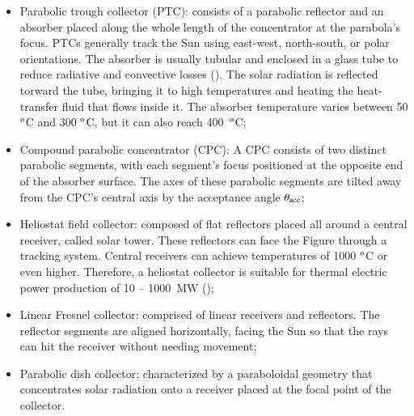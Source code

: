 \begin{itemize}
	\item Parabolic trough collector (PTC): consists of a parabolic reflector and an absorber placed along the whole length of the concentrator at the parabola's focus. PTCs generally track the Sun using east-west, north-south, or polar orientations. The absorber is usually tubular and enclosed in a glass tube to reduce radiative and convective losses (\cite{Goswami2015}). The solar radiation is reflected torward the tube, bringing it to high temperatures and heating the heat-transfer fluid that flows inside it. The absorber temperature varies between 50 $^{\rm{o}}$C and 300 $^{\rm{o}}$C, but it can also reach \mbox{400 $^{\rm{o}}$C};
	
	\item Compound parabolic concentrator (CPC): A CPC consists of two distinct parabolic segments, with each segment's focus positioned at the opposite end of the absorber surface. The axes of these parabolic segments are tilted away from the CPC's central axis by the acceptance angle $\theta_{{\rm{acc}}}$;
	
	
	\item Heliostat field collector: composed of flat reflectors placed all around a central receiver, called solar tower. These reflectors can face the Figure through a tracking system. Central receivers can achieve temperatures of 1000 $^{\rm{o}}$C or even higher. Therefore, a heliostat collector is suitable for thermal electric power production of 10 -- 1000~MW (\cite{Goswami2015});
	
	\item Linear Fresnel collector: comprised of linear receivers and reflectors. The reflector segments are aligned horizontally, facing the Sun so that the rays can hit the receiver without needing movement;
	
	\item Parabolic dish collector: characterized by a paraboloidal geometry that concentrates solar radiation onto a receiver placed at the focal point of the collector.
	
\end{itemize}

